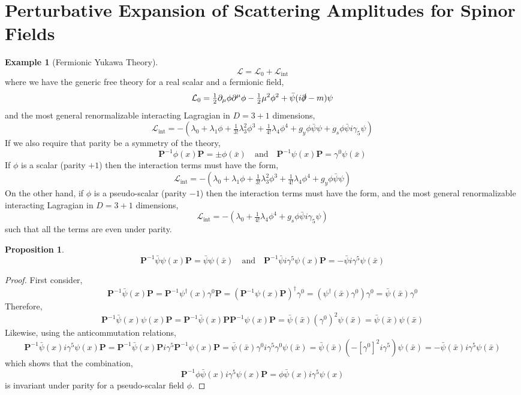 \documentclass[12pt]{extarticle}
\author{Benjamin Church }
\newcommand{\lagrange}{\mathcal{L}}
\newcommand{\ipic}{\mathrm{int}}
\newcommand{\parity}{\mathbf{P}}
\theoremstyle{definition}
\newtheorem{proposition}[theorem]{Proposition}
\newtheorem{example}[theorem]{Example}
\begin{document}
\section{Perturbative Expansion of Scattering Amplitudes for Spinor Fields}

\begin{example}[Fermionic Yukawa Theory]
\[ \lagrange = \lagrange_0 + \lagrange_{\ipic} \]
where we have the generic free theory for a real scalar and a fermionic field,
\[ \lagrange_0 = \tfrac{1}{2} \partial_\mu \phi \partial^\mu \phi - \tfrac{1}{2} \mu^2 \phi^2 + \bar{\psi} (i \slashed{\partial} - m)\psi \]
and the most general renormalizable interacting Lagragian in $D = 3 + 1$ dimensions,
\[ \lagrange_{\ipic} = - \left( \lambda_0 + \lambda_1 \phi + \tfrac{1}{3!} \lambda_3^2 \phi^3 + \tfrac{1}{4!} \lambda_4 \phi^4 + g_y \phi \bar{\psi} \psi + g_s \phi \bar{\psi}   i \gamma_5 \psi \right) \]
If we also require that parity be a symmetry of the theory,
\[ \mathbf{P}^{-1} \phi(x) \mathbf{P} = \pm \phi(\bar{x}) \quad \text{and} \quad \mathbf{P}^{-1} \psi(x) \mathbf{P} = \gamma^0 \psi(\bar{x}) \]
If $\phi$ is a scalar (parity $+1$) then the interaction terms must have the form,
\[ \lagrange_{\ipic} = -\left( \lambda_0 + \lambda_1 \phi + \tfrac{1}{3!} \lambda_3^2 \phi^3 + \tfrac{1}{4!} \lambda_4 \phi^4 + g_y \phi \bar{\psi} \psi \right) \]
On the other hand, if $\phi$ is a pseudo-scalar (parity $-1$) then the interaction terms must have the form,  
and the most general renormalizable interacting Lagragian in $D = 3 + 1$ dimensions,
\[ \lagrange_{\ipic} = - \left( \lambda_0  + \tfrac{1}{4!} \lambda_4 \phi^4 + g_s \phi \bar{\psi}  i \gamma_5 \psi \right) \]
such that all the terms are even under parity. 
\end{example}

\begin{proposition}
\[  \parity^{-1} \bar{\psi} \psi(x) \parity = \bar{\psi} \psi(\bar{x}) \quad \text{and} \quad \parity^{-1} \bar{\psi} i \gamma^5 \psi (x) \parity = - \bar{\psi} i \gamma^5 \psi (\bar{x}) \]
\end{proposition}

\begin{proof}
First consider,
\[ \parity^{-1} \bar{\psi}(x) \parity = \parity^{-1} \psi^{\dagger}(x) \gamma^0 \parity = (\parity^{-1} \psi(x) \parity)^\dagger \gamma^0 = ( \psi^\dagger(\bar{x}) \gamma^0) \gamma^0  = \bar{\psi}(\bar{x}) \gamma^0 \]
Therefore, 
\[ \parity^{-1} \bar{\psi}(x) \psi(x) \parity = \parity^{-1} \bar{\psi}(x) \parity \parity^{-1} \psi(x) \parity = \bar{\psi}(\bar{x}) (\gamma^0)^2 \psi(\bar{x}) = \bar{\psi}(\bar{x}) \psi(\bar{x}) \]
Likewise, using the anticommutation relations,
\[ \parity^{-1} \bar{\psi}(x) i \gamma^5 \psi(x) \parity = \parity^{-1} \bar{\psi}(x) \parity i \gamma^5 \parity^{-1} \psi(x) \parity = \bar{\psi}(\bar{x}) \gamma^0 i \gamma^5 \gamma^0 \psi(\bar{x}) = \bar{\psi}(\bar{x}) (-  [\gamma^0]^2 i \gamma^5 ) \psi(\bar{x}) = - \bar{\psi}(\bar{x}) i \gamma^5 \psi (\bar{x})  \]
which shows that the combination,
\[ \parity^{-1} \phi \bar{\psi}(x) i \gamma^5 \psi(x) \parity = \phi \bar{\psi}(x) i \gamma^5 \psi(x) \]
is invariant under parity for a pseudo-scalar field $\phi$. 
\end{proof}
\end{document}
